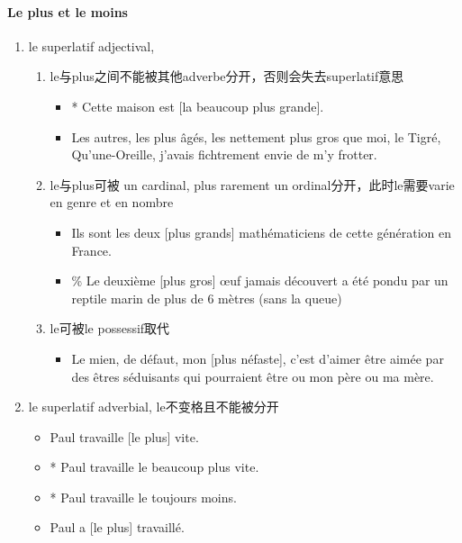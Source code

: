 \documentclass[UTF8]{report}
\begin{document}
\paragraph{Le plus et le moins}
\begin{enumerate}
    \item le superlatif adjectival,
    \begin{enumerate}
        \item le与plus之间不能被其他adverbe分开，否则会失去superlatif意思
        \begin{itemize}
            \item * Cette maison est [la beaucoup plus grande].
            \item Les autres, les plus âgés, les nettement plus gros que moi, le Tigré, Qu’une-Oreille, j’avais fichtrement envie de m’y frotter.
        \end{itemize}
        \item le与plus可被 un cardinal, plus rarement un ordinal分开，此时le需要varie en genre et en nombre
        \begin{itemize}
            \item Ils sont les deux [plus grands] mathématiciens de cette génération en France. 
            \item \% Le deuxième [plus gros] œuf jamais découvert a été pondu par un reptile marin de plus de 6 mètres (sans la queue)
        \end{itemize}
        \item le可被le possessif取代
        \begin{itemize}
            \item Le mien, de défaut, mon [plus néfaste], c’est d’aimer être aimée par des êtres séduisants qui pourraient être ou mon père ou ma mère.
        \end{itemize}
    \end{enumerate}
    \item le superlatif adverbial, le不变格且不能被分开
    \begin{itemize}
        \item Paul travaille [le plus] vite.
        \item * Paul travaille le beaucoup plus vite.
        \item * Paul travaille le toujours moins.
        \item Paul a [le plus] travaillé.
    \end{itemize}
\end{enumerate}
\end{document}
